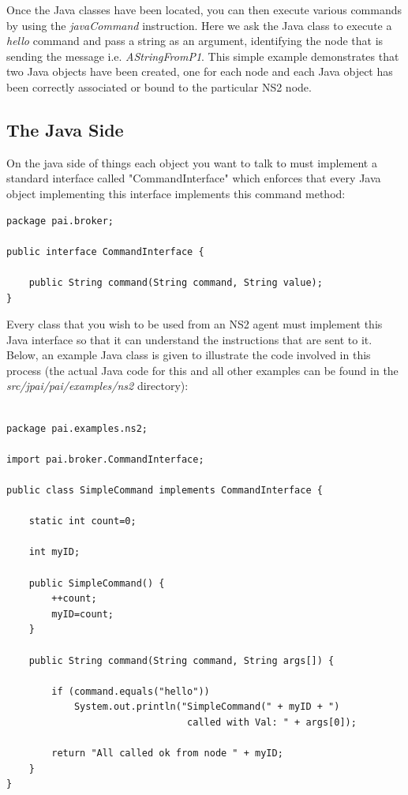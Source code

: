 Once the Java classes have been located, you can then execute various 
commands by using the \emph{javaCommand} instruction.  Here we
ask the Java class to execute a \emph{hello} command and pass
a string as an argument, identifying the node that is sending the message 
i.e. \emph{AStringFromP1}.  This simple example demonstrates that
two Java objects have been created, one for each node and each Java
object has been correctly associated or bound to the particular NS2
node.

\subsection{The Java Side}
\label{jni:javaside}

On the java side of things each object you want to talk to must implement a 
standard interface called "CommandInterface" which enforces that every Java
object implementing this interface implements this command method:

\footnotesize
\begin{verbatim}
package pai.broker;

public interface CommandInterface {

    public String command(String command, String value);
}
\end{verbatim}
\normalsize

Every class that you wish to be used from an NS2 agent must implement
this Java interface so that it can understand the instructions that are sent
to it. Below, an example Java class is given to illustrate the code involved 
in this process (the actual Java code for this and all other examples 
\sloppypar can be found in the \emph{src/jpai/pai/examples/ns2} directory):

\footnotesize
\begin{verbatim}

package pai.examples.ns2;

import pai.broker.CommandInterface;

public class SimpleCommand implements CommandInterface {

    static int count=0;

    int myID;

    public SimpleCommand() {
        ++count;
        myID=count;
    }

    public String command(String command, String args[]) {

        if (command.equals("hello"))
            System.out.println("SimpleCommand(" + myID + ") 
            					called with Val: " + args[0]);

        return "All called ok from node " + myID;
    }
}

\end{verbatim}
\normalsize

